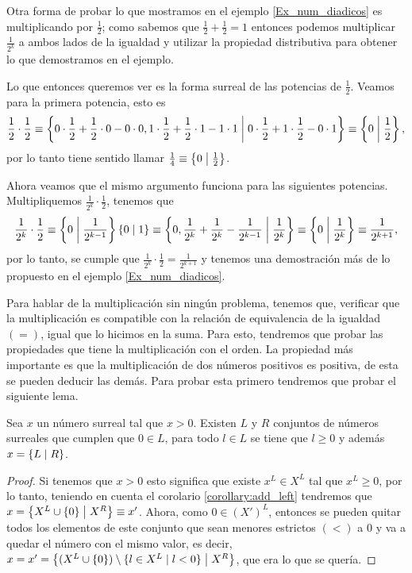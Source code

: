    \begin{example}
        Otra forma de probar lo que mostramos en el ejemplo \ref{Ex_num_diadicos} es multiplicando por $\frac{1}{2}$; como sabemos que $\frac{1}{2}+\frac{1}{2} = 1$ entonces podemos multiplicar $\frac{1}{2^k}$ a ambos lados de la igualdad y utilizar la propiedad distributiva para obtener lo que demostramos en el ejemplo.

        Lo que entonces queremos ver es la forma surreal de las potencias de $\frac{1}{2}$. Veamos para la primera potencia, esto es
        \[
            \frac{1}{2}\cdot\frac{1}{2} \equiv \left\{0\cdot\frac{1}{2} + \frac{1}{2}\cdot 0 - 0\cdot 0, 1\cdot \frac{1}{2} +\frac{1}{2}\cdot 1 - 1\cdot 1\;\middle|\; 0\cdot \frac{1}{2} + 1\cdot \frac{1}{2} - 0\cdot 1\right\} \equiv \left\{0\;\middle|\; \frac{1}{2}\right\},
        \]
        por lo tanto tiene sentido llamar $\frac{1}{4}\equiv \left\{0\;\middle|\; \frac{1}{2}\right\}$.

        Ahora veamos que el mismo argumento funciona para las siguientes potencias. Multipliquemos $\frac{1}{2^k}\cdot \frac{1}{2}$, tenemos que 
        \[
            \frac{1}{2^k}\cdot \frac{1}{2} \equiv \left\{0\;\middle|\; \frac{1}{2^{k-1}}\right\}\left\{0\;\middle|\; 1\right\} \equiv \left\{0, \frac{1}{2^{k}} + \frac{1}{2^{k}} - \frac{1}{2^{k-1}}\;\middle|\; \frac{1}{2^{k}}\right\}\equiv \left\{0\;\middle|\; \frac{1}{2^{k}}\right\}\equiv \frac{1}{2^{k+1}},
        \]
        por lo tanto, se cumple que $\frac{1}{2^k}\cdot \frac{1}{2} = \frac{1}{2^{k+1}}$ y tenemos una demostraci\'on m\'as de lo propuesto en el ejemplo \ref{Ex_num_diadicos}.
    \end{example}

    Para hablar de la multiplicaci\'on sin ning\'un problema, tenemos que, verificar que la multiplicaci\'on es compatible con la relaci\'on de equivalencia de la igualdad $(=)$, igual que lo hicimos en la suma. Para esto, tendremos que probar las propiedades que tiene la multiplicaci\'on con el orden. La propiedad m\'as importante es que la multiplicaci\'on de dos n\'umeros positivos es positiva, de esta se pueden deducir las dem\'as. Para probar esta primero tendremos que probar el siguiente lema.

    \begin{lemma}
        \label{normalize_positive_number}
        Sea $x$ un n\'umero surreal tal que $x > 0$. Existen $L$ y $R$ conjuntos de n\'umeros surreales que cumplen que $0\in L$, para todo $l\in L$ se tiene que $l \ge 0$ y adem\'as $x = \left\{L\;\middle|\; R\right\}$.
    \end{lemma}

    \begin{proof}
        Si tenemos que $x > 0$ esto significa que existe $x^L\in X^L$ tal que $x^L \ge 0$, por lo tanto, teniendo en cuenta el corolario \ref{corollary:add_left} tendremos que $x = \left\{X^L\cup \{0\}\;\middle|\; X^R\right\} \equiv x'$. Ahora, como $0\in (X')^L$, entonces se pueden quitar todos los elementos de este conjunto que sean menores estrictos $(<)$ a $0$ y va a quedar el n\'umero con el mismo valor, es decir, $x = x' = \left\{(X^L\cup \{0\})\setminus\{l\in X^L\;|\;l < 0\}\;\middle|\; X^R\right\}$, que era lo que se quer\'ia.

    \end{proof}

